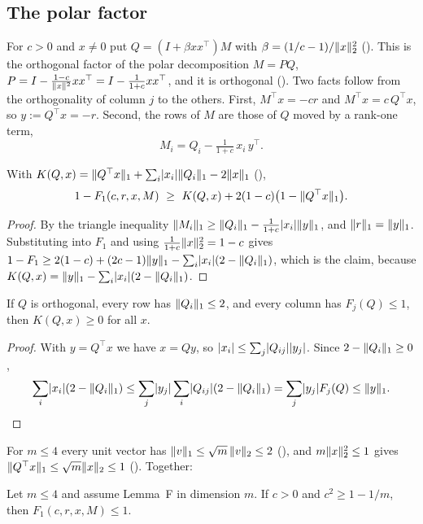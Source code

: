 \documentclass[11pt,a4paper]{article}
\begin{document}
\subsection{The polar factor}
For $c>0$ and $x\ne0$ put $Q=(I+\beta xx^\top)M$ with $\beta=(1/c-1)/\lVert x\rVert_2^2$ (). This is the orthogonal factor of the polar decomposition $M=PQ$, $P=I-\frac{1-c}{\lVert x\rVert^2}xx^\top=I-\frac{1}{1+c}xx^\top$, and it is orthogonal (). Two facts follow from the orthogonality of column $j$ to the others. First, $M^\top x=-cr$ and $M^\top x=c\,Q^\top x$, so $y:=Q^\top x=-r$. Second, the rows of $M$ are those of $Q$ moved by a rank-one term,
\[
M_i=Q_i-\tfrac{1}{1+c}\,x_i\,y^\top .
\]

\begin{lemma}\label{lem:near-identity}
With $K(Q,x)=\lVert Q^\top x\rVert_1+\sum_i\lvert x_i\rvert\lVert Q_i\rVert_1-2\lVert x\rVert_1$ (),
\[
1-F_1(c,r,x,M)\ \ge\ K(Q,x)+2(1-c)\bigl(1-\norm{Q^\top x}_1\bigr).
\]
\end{lemma}
\begin{proof}
By the triangle inequality $\lVert M_i\rVert_1\ge\lVert Q_i\rVert_1-\frac{1}{1+c}\lvert x_i\rvert\lVert y\rVert_1$, and $\lVert r\rVert_1=\lVert y\rVert_1$. Substituting into $F_1$ and using $\frac{1}{1+c}\lVert x\rVert_2^2=1-c$ gives
$1-F_1\ge 2(1-c)+(2c-1)\lVert y\rVert_1-\sum_i\lvert x_i\rvert(2-\lVert Q_i\rVert_1)$, which is the claim, because $K(Q,x)=\lVert y\rVert_1-\sum_i\lvert x_i\rvert(2-\lVert Q_i\rVert_1)$.
\end{proof}

\begin{lemma}
If $Q$ is orthogonal, every row has $\lVert Q_i\rVert_1\le2$, and every column has $F_j(Q)\le1$, then $K(Q,x)\ge0$ for all $x$.
\end{lemma}
\begin{proof}
With $y=Q^\top x$ we have $x=Qy$, so $\lvert x_i\rvert\le\sum_j\lvert Q_{ij}\rvert\lvert y_j\rvert$. Since $2-\lVert Q_i\rVert_1\ge0$,
\[
\sum_i\lvert x_i\rvert(2-\lVert Q_i\rVert_1)\le\sum_j\lvert y_j\rvert\sum_i\lvert Q_{ij}\rvert(2-\lVert Q_i\rVert_1)=\sum_j\lvert y_j\rvert F_j(Q)\le\lVert y\rVert_1. \qedhere
\]
\end{proof}

For $m\le4$ every unit vector has $\lVert v\rVert_1\le\sqrt m\,\lVert v\rVert_2\le2$ (), and $m\lVert x\rVert_2^2\le1$ gives $\lVert Q^\top x\rVert_1\le\sqrt m\lVert x\rVert_2\le1$ (). Together:

\begin{theorem}\label{thm:near}
Let $m\le4$ and assume Lemma~F in dimension $m$. If $c>0$ and $c^2\ge1-1/m$, then $F_1(c,r,x,M)\le1$.
\end{theorem}
\end{document}
